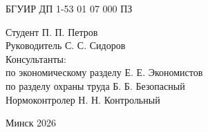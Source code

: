 \begin{center}
    БГУИР ДП 1-53 01 07 000 ПЗ
    
    \vfill
    
    \begin{flushright}
        \begin{minipage}{0.7\textwidth}
            Студент \underline{\hspace{3cm}} П. П. Петров \\ %
            Руководитель \underline{\hspace{3cm}} С. С. Сидоров \\ %
            Консультанты: \\
            по экономическому разделу \underline{\hspace{2cm}} Е. Е. Экономистов \\
            по разделу охраны труда \underline{\hspace{2.5cm}} Б. Б. Безопасный \\
            Нормоконтролер \underline{\hspace{3cm}} Н. Н. Контрольный
        \end{minipage}
    \end{flushright}
    
    \vspace{1cm}
    
    Минск 2026
\end{center}

\newpage
